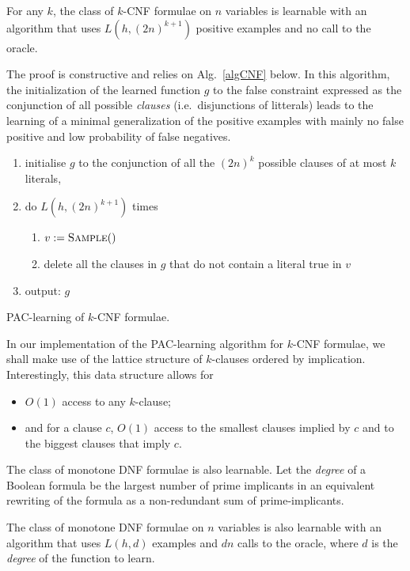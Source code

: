 \documentclass{llncs}
\begin{document}
\begin{theorem}\label{thm:kcnf}
For any $k$, the class of $k$-CNF formulae on $n$ variables is learnable with an
algorithm that uses $L(h,{(2 n)}^{k+1})$ positive examples and no call to the
oracle.
\end{theorem}

The proof is constructive and relies on Alg.~\ref{algCNF} below. In this algorithm, the initialization of the learned function $g$ to the false constraint expressed as the conjunction of all possible \emph{clauses} (i.e.~disjunctions of litterals)
leads to the learning of a minimal generalization of the positive examples with mainly no false positive and low probability of false negatives.

\begin{algorithm}
\begin{enumerate}
  \item initialise $g$ to the conjunction of all the $(2n)^k$ possible clauses of at most $k$ literals,
\item do $L(h,(2n)^{k+1})$ times 
\begin{enumerate}
\item $v:=\textsc{Sample}()$
\item delete all the clauses in $g$ that do not contain a literal true in $v$
\end{enumerate}
\item output: $g$
\end{enumerate}
\caption{PAC-learning of $k$-CNF formulae.\label{algCNF}}
\end{algorithm}

In our implementation of the PAC-learning algorithm for $k$-CNF formulae,
we shall make use of the lattice structure of $k$-clauses ordered by implication.
Interestingly, this data structure allows for
\begin{itemize}
	\item $O(1)$ access to any $k$-clause;
	\item and for a clause $c$, $O(1)$ access to the smallest clauses implied by $c$ and to the biggest clauses that imply $c$.
\end{itemize}

The class of monotone DNF formulae is also learnable.
Let the \emph{degree} of a Boolean formula be the largest number of prime
implicants in an equivalent rewriting of the formula as a non-redundant sum of
prime-implicants.


\begin{theorem}\label{thm:mdnf}
    The class of monotone DNF formulae on $n$ variables is also learnable with an
    algorithm that uses $L(h,d)$ examples and $d n$ calls to the oracle,
    where $d$ is the \emph{degree} of the function to learn.
\end{theorem}
\end{document}
